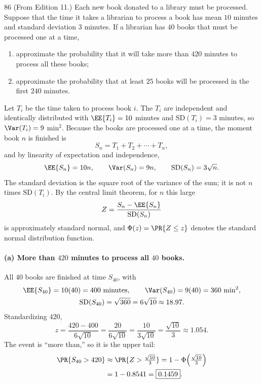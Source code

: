 \documentclass[11pt]{article}
\begin{document}
\begin{problem}{86}
  (From Edition 11.) Each new book donated to a library must be processed.
  Suppose that the time it takes a librarian to process a book has mean
  $10$ minutes and standard deviation $3$ minutes. If a librarian has $40$
  books that must be processed one at a time,
  \begin{enumerate}
    \item approximate the probability that it will take more than $420$
      minutes to process all these books;
    \item approximate the probability that at least $25$ books will be
      processed in the first $240$ minutes.
  \end{enumerate}
\end{problem}
Let $T_{i}$ be the time taken to process book $i$. The $T_{i}$ are independent and
identically distributed with $\EE{T_{i}} = 10$ minutes and $\mathrm{SD}(T_{i}) = 3$
minutes, so $\Var(T_{i}) = 9$ min$^{2}$. Because the books are processed one at a time,
the moment book $n$ is finished is
\[
  S_{n} = T_{1} + T_{2} + \cdots + T_{n},
\]
and by linearity of expectation and independence,
\[
  \EE{S_{n}} = 10n, \qquad \Var(S_{n}) = 9n, \qquad \mathrm{SD}(S_{n}) = 3\sqrt{n}.
\]
The standard deviation is the square root of the variance of the sum; it is not $n$ times
$\mathrm{SD}(T_{i})$. By the central limit theorem, for $n$ this large
\[
  Z = \frac{S_{n} - \EE{S_{n}}}{\mathrm{SD}(S_{n})}
\]
is approximately standard normal, and $\Phi(z) = \PR{Z \le z}$ denotes the standard normal
distribution function.

\paragraph{(a) More than $420$ minutes to process all $40$ books.}
All $40$ books are finished at time $S_{40}$, with
\begin{gather*}
  \EE{S_{40}} = 10(40) = 400 \text{ minutes}, \qquad
  \Var(S_{40}) = 9(40) = 360 \text{ min}^{2},\\
  \mathrm{SD}(S_{40}) = \sqrt{360} = 6\sqrt{10} \approx 18.97 .
\end{gather*}
Standardizing $420$,
\[
  z = \frac{420 - 400}{6\sqrt{10}} = \frac{20}{6\sqrt{10}} = \frac{10}{3\sqrt{10}}
    = \frac{\sqrt{10}}{3} \approx 1.054 .
\]
The event is ``more than,'' so it is the upper tail:
\begin{align*}
  \PR{S_{40} > 420}
    &\approx \PR{Z > \tfrac{\sqrt{10}}{3}}
     = 1 - \Phi\!\left(\tfrac{\sqrt{10}}{3}\right)\\
    &= 1 - 0.8541
     = \boxed{0.1459}.
\end{align*}
\end{document}
